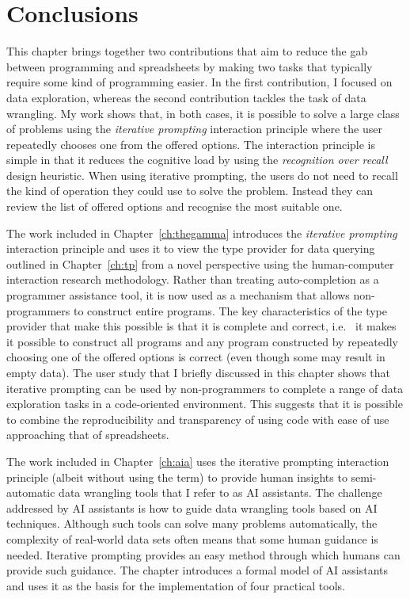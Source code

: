 \documentclass[fleqn,11pt]{report}
\theoremstyle{definition}
\begin{document}
\section{Conclusions}

This chapter brings together two contributions that aim to reduce the gab between programming
and spreadsheets by making two tasks that typically require some kind of programming easier.
In the first contribution, I focused on data exploration, whereas the second contribution tackles
the task of data wrangling. My work shows that, in both cases, it is possible to solve
a large class of problems using the \emph{iterative prompting} interaction principle where the
user repeatedly chooses one from the offered options. The interaction principle is simple in
that it reduces the cognitive load by using the \emph{recognition over recall} design heuristic.
When using iterative prompting, the users do not need to recall the kind of operation they
could use to solve the problem. Instead they can review the list of offered options and recognise
the most suitable one.

The work included in Chapter~\ref{ch:thegamma} introduces the \emph{iterative prompting}
interaction principle and uses it to view the type provider for data querying outlined in
Chapter~\ref{ch:tp} from a novel perspective using the human-computer interaction research
methodology. Rather than treating auto-completion as a programmer assistance tool, it is
now used as a mechanism that allows non-programmers to construct entire programs. The key
characteristics of the type provider that make this possible is that it is complete and correct,
i.e.~ it makes it possible to construct all programs and any program constructed by
repeatedly choosing one of the offered options is correct (even though some may result in
empty data). The user study that I briefly discussed in this chapter shows that iterative
prompting can be used by non-programmers to complete a range of data exploration tasks
in a code-oriented environment. This suggests that it is possible to combine the reproducibility
and transparency of using code with ease of use approaching that of spreadsheets.

The work included in Chapter~\ref{ch:aia} uses the iterative prompting interaction principle
(albeit without using the term) to provide human insights to semi-automatic data wrangling
tools that I refer to as AI assistants. The challenge addressed by AI assistants is how to
guide data wrangling tools based on AI techniques. Although such tools can solve many problems
automatically, the complexity of real-world data sets often means that some human guidance
is needed. Iterative prompting provides an easy method through which humans can provide such
guidance. The chapter introduces a formal model of AI assistants and uses it as the basis for
the implementation of four practical tools.
\end{document}
